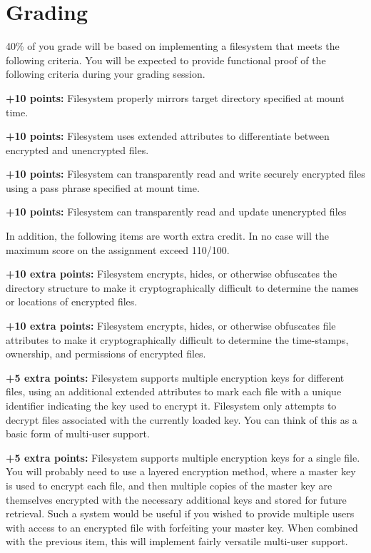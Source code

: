 \documentclass[12pt]{article}
\newenvironment{packed_item}{
\begin{itemize}
  \setlength{\itemsep}{1pt}
  \setlength{\parskip}{0pt}
  \setlength{\parsep}{0pt}
}{\end{itemize}}
\begin{document}
\section{Grading}

40\% of you grade will be based on implementing a filesystem that
meets the following criteria. You will be expected to provide
functional proof of the following criteria during your grading
session.

\begin{packed_item}
\item {\bf +10 points:} Filesystem properly mirrors target directory
  specified at mount time.
\item {\bf +10 points:} Filesystem uses extended attributes to differentiate
  between encrypted and unencrypted files.
\item {\bf +10 points:} Filesystem can transparently read and write
  securely encrypted files using a pass phrase specified at mount time.
\item {\bf +10 points:} Filesystem can transparently read and update unencrypted
  files
\end{packed_item}

In addition, the following items are worth extra credit. In no case
will the maximum score on the assignment exceed 110/100.
\begin{packed_item}
\item {\bf +10 extra points:} Filesystem encrypts, hides, or
  otherwise obfuscates the directory structure to make it
  cryptographically difficult to determine the names or locations of
  encrypted files.
\item {\bf +10 extra points:} Filesystem encrypts, hides, or
  otherwise obfuscates file attributes to make it
  cryptographically difficult to determine the time-stamps, ownership,
  and permissions of encrypted files.
\item {\bf +5 extra points:} Filesystem supports multiple encryption
  keys for different files,
  using an additional extended attributes to mark each file with
  a unique identifier indicating the key used to encrypt it. Filesystem only
  attempts to decrypt files associated with the currently loaded
  key. You can think of this as a basic form of multi-user support.
\item {\bf +5 extra points:} Filesystem supports multiple encryption
  keys for a single file. You will probably need to use a layered
  encryption method, where a master key is used to encrypt each file,
  and then multiple copies of the master key are themselves encrypted
  with the necessary additional keys and stored for future
  retrieval. Such a system would be useful if you wished to provide
  multiple users with access to an encrypted file with forfeiting your
  master key. When combined with the previous item, this will implement
  fairly versatile multi-user support.
\end{packed_item}
\end{document}
